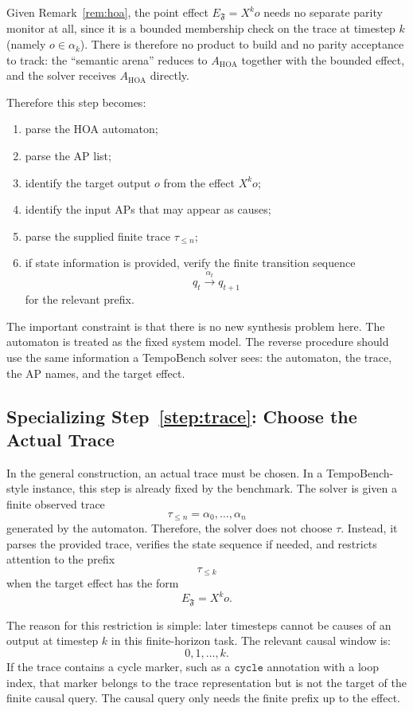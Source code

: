 \documentclass[11pt]{article}
\theoremstyle{remark}
\newcommand{\Frame}{\mathfrak{F}}
\begin{document}
Given Remark~\ref{rem:hoa}, the point effect \(E_{\Frame}=X^k o\) needs no
separate parity monitor at all, since it is a bounded membership check on the
trace at timestep \(k\) (namely \(o\in\alpha_k\)). There is therefore no product
to build and no parity acceptance to track: the ``semantic arena'' reduces to
\(A_{\mathrm{HOA}}\) together with the bounded effect, and the solver receives
\(A_{\mathrm{HOA}}\) directly.

Therefore this step becomes:
\begin{enumerate}[label=\arabic*.]
  \item parse the HOA automaton;
  \item parse the AP list;
  \item identify the target output \(o\) from the effect \(X^k o\);
  \item identify the input APs that may appear as causes;
  \item parse the supplied finite trace \(\tau_{\le n}\);
  \item if state information is provided, verify the finite transition sequence
        \[
          q_t\xrightarrow{\alpha_t}q_{t+1}
        \]
        for the relevant prefix.
\end{enumerate}

The important constraint is that there is no new synthesis problem here. The
automaton is treated as the fixed system model. The reverse procedure should use
the same information a TempoBench solver sees: the automaton, the trace, the AP
names, and the target effect.

\subsection{Specializing Step~\ref{step:trace}: Choose the Actual Trace}

In the general construction, an actual trace must be chosen. In a
TempoBench-style instance, this step is already fixed by the benchmark. The
solver is given a finite observed trace
\[
  \tau_{\le n}=\alpha_0,\ldots,\alpha_n
\]
generated by the automaton. Therefore, the solver does not choose \(\tau\).
Instead, it parses the provided trace, verifies the state sequence if needed,
and restricts attention to the prefix
\[
  \tau_{\le k}
\]
when the target effect has the form
\[
  E_{\Frame}=X^k o.
\]

The reason for this restriction is simple: later timesteps cannot be causes of
an output at timestep \(k\) in this finite-horizon task. The relevant causal
window is:
\[
  0,1,\ldots,k.
\]
If the trace contains a cycle marker, such as a \(\texttt{cycle}\) annotation
with a loop index, that marker belongs to the trace representation but is not
the target of the finite causal query. The causal query only needs the finite
prefix up to the effect.
\end{document}
